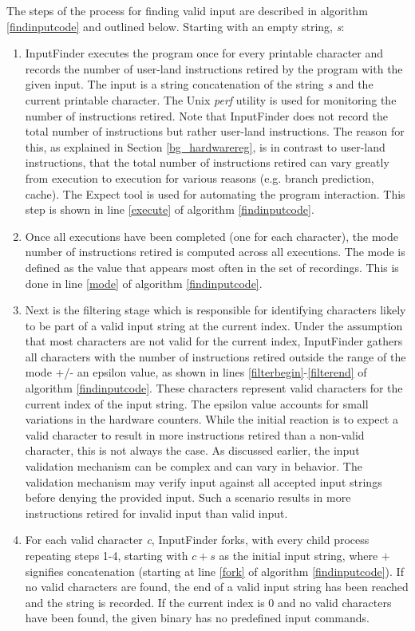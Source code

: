 \documentclass{acm_proc_article-sp}
\def \tool {InputFinder}
\begin{document}
The steps of the process for finding valid input are described in algorithm \ref{findinputcode} and outlined below. Starting with an empty string, \textit{s}:
\begin{enumerate}
\item \tool{} executes the program once for every printable character and records the number of user-land instructions retired by the program with the given input. The input is a string concatenation of the string \textit{s} and the current printable character. The Unix \textit{perf} utility is used for monitoring the number of instructions retired. Note that \tool{} does not record the total number of instructions but rather user-land instructions. The reason for this, as explained in Section \ref{bg_hardwarereg}, is in contrast to user-land instructions, that the total number of instructions retired can vary greatly from execution to execution for various reasons (e.g. branch prediction, cache). The Expect tool is used for automating the program interaction. This step is shown in line \ref{execute} of algorithm \ref{findinputcode}.
\item Once all executions have been completed (one for each character), the mode number of instructions retired is computed across all executions. The mode is defined as the value that appears most often in the set of recordings. This is done in line \ref{mode} of algorithm \ref{findinputcode}.
\item Next is the filtering stage which is responsible for identifying characters likely to be part of a valid input string at the current index. Under the assumption that most characters are not valid for the current index, \tool{} gathers all characters with the number of instructions retired outside the range of the mode +/- an epsilon value, as shown in lines \ref{filterbegin}-\ref{filterend} of algorithm \ref{findinputcode}. These characters represent valid characters for the current index of the input string. The epsilon value accounts for small variations in the hardware counters. While the initial reaction is to expect a valid character to result in more instructions retired than a non-valid character, this is not always the case. As discussed earlier, the input validation mechanism can be complex and can vary in behavior. The validation mechanism may verify input against all accepted input strings before denying the provided input. Such a scenario results in more instructions retired for invalid input than valid input.
\item For each valid character \textit{c}, \tool{} forks, with every child process repeating steps 1-4, starting with $ c + s $ as the initial input string, where $+$ signifies concatenation (starting at line \ref{fork} of algorithm \ref{findinputcode}). If no valid characters are found, the end of a valid input string has been reached and the string is recorded. If the current index is 0 and no valid characters have been found, the given binary has no predefined input commands.
\end{enumerate}
\end{document}
